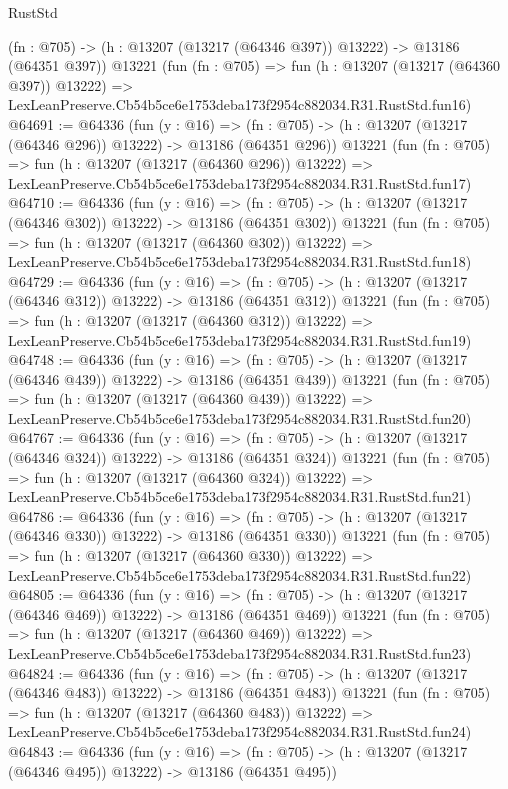 \begin{lexlean}{RustStd}
\begin{coremodule}
    (fn : @705) -> (h : @13207 (@13217 (@64346 @397)) @13222) -> @13186 (@64351 @397))
    @13221
    (fun (fn : @705) =>
    fun (h : @13207 (@13217 (@64360 @397)) @13222) =>
    LexLeanPreserve.Cb54b5ce6e1753deba173f2954c882034.R31.RustStd.fun16)
@64691 := @64336
    (fun (y : @16) =>
    (fn : @705) -> (h : @13207 (@13217 (@64346 @296)) @13222) -> @13186 (@64351 @296))
    @13221
    (fun (fn : @705) =>
    fun (h : @13207 (@13217 (@64360 @296)) @13222) =>
    LexLeanPreserve.Cb54b5ce6e1753deba173f2954c882034.R31.RustStd.fun17)
@64710 := @64336
    (fun (y : @16) =>
    (fn : @705) -> (h : @13207 (@13217 (@64346 @302)) @13222) -> @13186 (@64351 @302))
    @13221
    (fun (fn : @705) =>
    fun (h : @13207 (@13217 (@64360 @302)) @13222) =>
    LexLeanPreserve.Cb54b5ce6e1753deba173f2954c882034.R31.RustStd.fun18)
@64729 := @64336
    (fun (y : @16) =>
    (fn : @705) -> (h : @13207 (@13217 (@64346 @312)) @13222) -> @13186 (@64351 @312))
    @13221
    (fun (fn : @705) =>
    fun (h : @13207 (@13217 (@64360 @312)) @13222) =>
    LexLeanPreserve.Cb54b5ce6e1753deba173f2954c882034.R31.RustStd.fun19)
@64748 := @64336
    (fun (y : @16) =>
    (fn : @705) -> (h : @13207 (@13217 (@64346 @439)) @13222) -> @13186 (@64351 @439))
    @13221
    (fun (fn : @705) =>
    fun (h : @13207 (@13217 (@64360 @439)) @13222) =>
    LexLeanPreserve.Cb54b5ce6e1753deba173f2954c882034.R31.RustStd.fun20)
@64767 := @64336
    (fun (y : @16) =>
    (fn : @705) -> (h : @13207 (@13217 (@64346 @324)) @13222) -> @13186 (@64351 @324))
    @13221
    (fun (fn : @705) =>
    fun (h : @13207 (@13217 (@64360 @324)) @13222) =>
    LexLeanPreserve.Cb54b5ce6e1753deba173f2954c882034.R31.RustStd.fun21)
@64786 := @64336
    (fun (y : @16) =>
    (fn : @705) -> (h : @13207 (@13217 (@64346 @330)) @13222) -> @13186 (@64351 @330))
    @13221
    (fun (fn : @705) =>
    fun (h : @13207 (@13217 (@64360 @330)) @13222) =>
    LexLeanPreserve.Cb54b5ce6e1753deba173f2954c882034.R31.RustStd.fun22)
@64805 := @64336
    (fun (y : @16) =>
    (fn : @705) -> (h : @13207 (@13217 (@64346 @469)) @13222) -> @13186 (@64351 @469))
    @13221
    (fun (fn : @705) =>
    fun (h : @13207 (@13217 (@64360 @469)) @13222) =>
    LexLeanPreserve.Cb54b5ce6e1753deba173f2954c882034.R31.RustStd.fun23)
@64824 := @64336
    (fun (y : @16) =>
    (fn : @705) -> (h : @13207 (@13217 (@64346 @483)) @13222) -> @13186 (@64351 @483))
    @13221
    (fun (fn : @705) =>
    fun (h : @13207 (@13217 (@64360 @483)) @13222) =>
    LexLeanPreserve.Cb54b5ce6e1753deba173f2954c882034.R31.RustStd.fun24)
@64843 := @64336
    (fun (y : @16) =>
    (fn : @705) -> (h : @13207 (@13217 (@64346 @495)) @13222) -> @13186 (@64351 @495))

\end{coremodule}
\end{lexlean}
